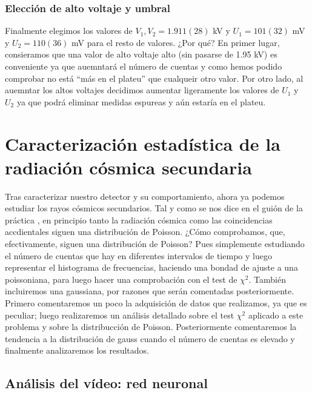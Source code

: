 \documentclass[11pt]{article}
\begin{document}


\subsubsection{Elección de alto voltaje y umbral}

Finalmente elegimos los valores de $V_1,V_2=1.911(28)$ kV y $U_1=101(32)$ mV y $U_2=110(36)$ mV para el resto de valores. ¿Por qué? En primer lugar, consieramos que una valor de alto voltaje alto (sin pasarse de 1.95 kV) es conveniente ya que auemntará el número de cuentas y como hemos podido comprobar no está ``más en el plateu'' que cualqueir otro valor. Por otro lado, al auemntar los altos voltajes decidimos aumentar ligeramente los valores de $U_1$ y $U_2$ ya que podrá eliminar medidas espureas y aún estaría en el plateu. 



\section{Caracterización estadística de la radiación cósmica secundaria} \label{Sec:estadistica}

Tras caracterizar nuestro detector y su comportamiento, ahora ya podemos estudiar los rayos cósmicos secundarios. Tal y como se nos dice en el guión de la práctica \cite{P2}, en principio tanto la radiación cósmica como las coincidencias accdientales siguen una distribución de Poisson. ¿Cómo comprobamos, que, efectivamente, siguen una distribución de Poisson? Pues simplemente estudiando el número de cuentas que hay en diferentes intervalos de tiempo y luego representar el histograma de frecuencias, haciendo una bondad de ajuste a una poissoniana, para luego hacer una comprobación con el test de $\chi^2$. También incluiremos una gaussiana, por razones que serán comentadas posteriormente. Primero comentaremos un poco la adquisición de datos que realizamos, ya que es peculiar; luego realizaremos un análisis detallado sobre el test $\chi^2$ aplicado a este problema y sobre la distribucción de Poisson. Posteriormente comentaremos la tendencia a la distribución de gauss cuando el número de cuentas es elevado y finalmente analizaremos los resultados. 

\subsection{Análisis del vídeo: red neuronal}
\end{document}
